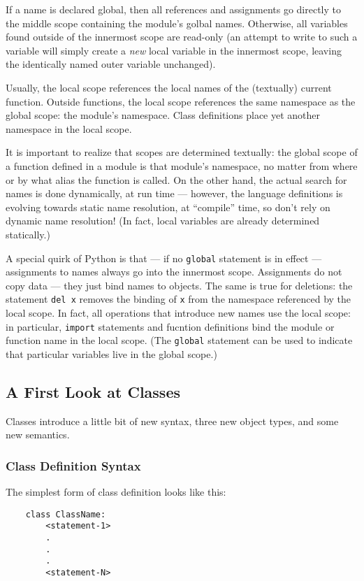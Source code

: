 \documentclass[UTF8]{article}
\begin{document}
If a name is declared global, then all references and assignments go directly to the middle scope
containing the module's golbal names. Otherwise, all variables found outside of the innermost scope
are read-only (an attempt to write to such a variable will simply create a \emph{new} local
variable in the innermost scope, leaving the identically named outer variable unchanged).

Usually, the local scope references the local names of the (textually) current function. Outside
functions, the local scope references the same namespace as the global scope: the module's
namespace. Class definitions place yet another namespace in the local scope.

It is important to realize that scopes are determined textually: the global scope of a function
defined in a module is that module's namespace, no matter from where or by what alias the function
is called. On the other hand, the actual search for names is done dynamically, at run time ---
however, the language definitions is evolving towards static name resolution, at ``compile'' time,
so don't rely on dynamic name resolution! (In fact, local variables are already determined
statically.)

A special quirk of Python is that --- if no \texttt{global} statement is in effect --- assignments
to names always go into the innermost scope. Assignments do not copy data --- they just bind names
to objects. The same is true for deletions: the statement \texttt{del x} removes the binding of
\texttt{x} from the namespace referenced by the local scope. In fact, all operations that introduce
new names use the local scope: in particular, \texttt{import} statements and fucntion definitions
bind the module or function name in the local scope. (The \texttt{global} statement can be used to
indicate that particular variables live in the global scope.)

\subsection{A First Look at Classes}
Classes introduce a little bit of new syntax, three new object types, and some new semantics.

\subsubsection{Class Definition Syntax}
The simplest form of class definition looks like this:
\begin{verbatim}
    class ClassName:
        <statement-1>
        .
        .
        .
        <statement-N>
\end{verbatim}
\end{document}
